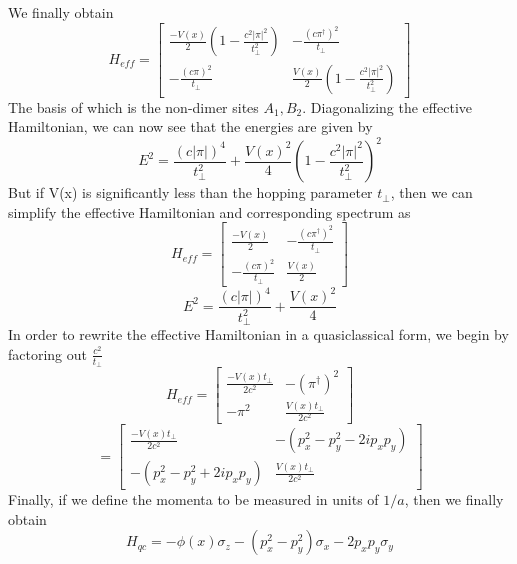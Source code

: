 \documentclass{article}
\begin{document}
We finally obtain
\begin{equation}
H_{eff} =
\begin{bmatrix}
\frac{-V(x)}{2}(1 - \frac{c^{2}|\pi|^{2}}{t_{\perp}^2}) & -\frac{(c\pi^{\dagger})^{2}}{t_{\perp}}\\
-\frac{(c\pi)^{2}}{t_{\perp}} & \frac{V(x)}{2}(1 - \frac{c^{2}|\pi|^{2}}{t_{\perp}^2})
\end{bmatrix}
\end{equation}
The basis of which is the non-dimer sites ${A_{1}, B_{2}}$.
Diagonalizing the effective Hamiltonian, we can now see that the energies are given by
\begin{equation}
E^{2} = \frac{(c|\pi|)^{4}}{t_{\perp}^{2}} + \frac{V(x)^{2}}{4}\left (1 - \frac{c^{2}|\pi|^{2}}{t_{\perp}^2}\right )^{2}
\end{equation}
But if V(x) is significantly less than the hopping parameter $t_{\perp}$, then we can simplify the effective Hamiltonian and corresponding spectrum as
\begin{equation}
H_{eff} =
\begin{bmatrix}
\frac{-V(x)}{2} & -\frac{(c\pi^{\dagger})^{2}}{t_{\perp}}\\
-\frac{(c\pi)^{2}}{t_{\perp}} & \frac{V(x)}{2}
\end{bmatrix}
\end{equation}
\begin{equation}
E^{2} = \frac{(c|\pi|)^{4}}{t_{\perp}^{2}} + \frac{V(x)^{2}}{4}
\end{equation}
In order to rewrite the effective Hamiltonian in a quasiclassical form, we begin by factoring out
$\frac{c^2}{t_{\perp}}$
\begin{equation}
H_{eff} =
\begin{bmatrix}
\frac{-V(x)t_{\perp}}{2c^{2}} & -(\pi^{\dagger})^{2}\\
-\pi^{2} & \frac{V(x)t_{\perp}}{2c^{2}}
\end{bmatrix}
\end{equation}
\begin{equation}
=
\begin{bmatrix}
\frac{-V(x)t_{\perp}}{2c^{2}} & -(p_{x}^{2} - p_{y}^{2} - 2ip_{x}p_{y})\\
-(p_{x}^{2} - p_{y}^{2} + 2ip_{x}p_{y}) & \frac{V(x)t_{\perp}}{2c^{2}}
\end{bmatrix}
\end{equation}
Finally, if we define the momenta to be measured in units of $1/a$, then we finally obtain
\begin{equation}
H_{qc} = -\phi(x)\sigma_{z} - (p_{x}^{2} - p_{y}^{2})\sigma_{x} - 2p_{x}p_{y}\sigma_{y}
\end{equation}
\end{document}
